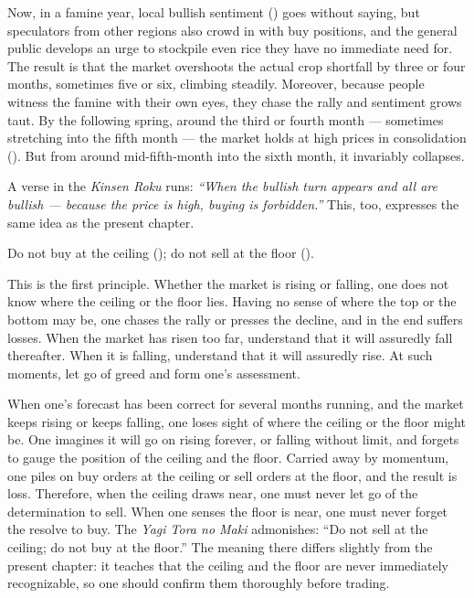 Now, in a famine year, local bullish sentiment () goes
without saying, but speculators from other regions also crowd in with
buy positions, and the general public develops an urge to stockpile
even rice they have no immediate need for. The result is that the
market overshoots the actual crop shortfall by three or four months,
sometimes five or six, climbing steadily. Moreover, because people
witness the famine with their own eyes, they chase the rally and
sentiment grows taut. By the following spring, around the third or
fourth month --- sometimes stretching into the fifth month --- the
market holds at high prices in consolidation (). But
from around mid-fifth-month into the sixth month, it invariably
collapses.

A verse in the \textit{Kinsen Roku} runs: \textit{``When the bullish turn appears
and all are bullish --- because the price is high, buying is
forbidden.''} This, too, expresses the same idea as the present
chapter.


\begin{sokyubox}
{\small\itshape\color{sokyubar} }

\medskip
Do not buy at the ceiling (); do not sell at the floor
().

This is the first principle. Whether the market is rising or falling,
one does not know where the ceiling or the floor lies. Having no
sense of where the top or the bottom may be, one chases the rally or
presses the decline, and in the end suffers losses. When the market
has risen too far, understand that it will assuredly fall thereafter.
When it is falling, understand that it will assuredly rise. At such
moments, let go of greed and form one's assessment.
\end{sokyubox}

\commentary
When one's forecast has been correct for several months running, and
the market keeps rising or keeps falling, one loses sight of where
the ceiling or the floor might be. One imagines it will go on rising
forever, or falling without limit, and forgets to gauge the position
of the ceiling and the floor. Carried away by momentum, one piles on
buy orders at the ceiling or sell orders at the floor, and the result
is loss. Therefore, when the ceiling draws near, one must never let
go of the determination to sell. When one senses the floor is near,
one must never forget the resolve to buy. The \textit{Yagi Tora no Maki}
admonishes: ``Do not sell at the ceiling; do not buy at the floor.''
The meaning there differs slightly from the present chapter: it
teaches that the ceiling and the floor are never immediately
recognizable, so one should confirm them thoroughly before trading.

